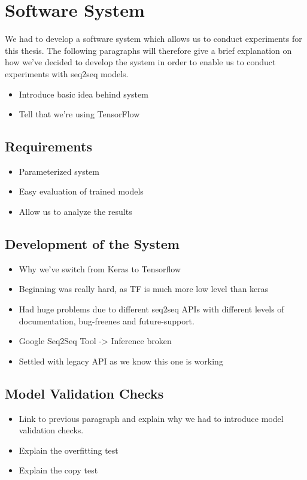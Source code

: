 \chapter{Software System}
We had to develop a software system which allows us to conduct experiments for this thesis. The following paragraphs will therefore give a brief explanation on how we've decided to develop the system in order to enable us to conduct experiments with seq2seq models.

\begin{itemize}
	\item Introduce basic idea behind system
	\item Tell that we're using TensorFlow
\end{itemize}
\section{Requirements}
\begin{itemize}
	\item Parameterized system
	\item Easy evaluation of trained models
	\item Allow us to analyze the results
\end{itemize}
\section{Development of the System}
\begin{itemize}
	\item Why we've switch from Keras to Tensorflow
	\item Beginning was really hard, as TF is much more low level than keras
	\item Had huge problems due to different seq2seq APIs with different levels of documentation, bug-freenes and future-support.
	\item Google Seq2Seq Tool -> Inference broken
	\item Settled with legacy API as we know this one is working
\end{itemize}
\section{Model Validation Checks}
\begin{itemize}
	\item Link to previous paragraph and explain why we had to introduce model validation checks.
	\item Explain the overfitting test
	\item Explain the copy test
\end{itemize}

